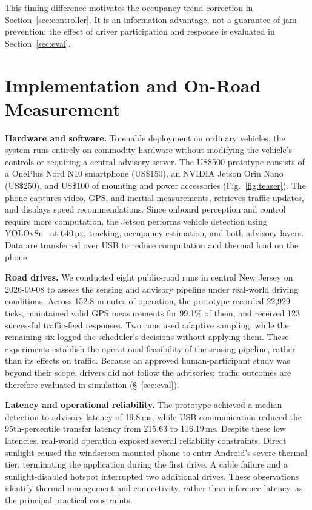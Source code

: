 \documentclass[letterpaper, 10pt, journal, twoside]{IEEEtran}
\begin{document}
This timing difference motivates the occupancy-trend correction in Section~\ref{sec:controller}. It is an information advantage, not a guarantee of jam prevention; the effect of driver participation and response is evaluated in Section~\ref{sec:eval}.

\section{Implementation and On-Road Measurement}

\label{sec:road}

\noindent\textbf{Hardware and software.} To enable deployment on ordinary vehicles, the system runs entirely on commodity hardware without modifying the vehicle's controls or requiring a central advisory server. The US\$500 prototype consists of a OnePlus Nord N10 smartphone (US\$150), an NVIDIA Jetson Orin Nano (US\$250), and US\$100 of mounting and power accessories (Fig.~\ref{fig:teaser}). The phone captures video, GPS, and inertial measurements, retrieves traffic updates, and displays speed recommendations. Since onboard perception and control require more computation, the Jetson performs vehicle detection using YOLOv8n~\cite{redmon2016yolo} at 640\,px, tracking, occupancy estimation, and both advisory layers. Data are transferred over USB to reduce computation and thermal load on the phone.

\noindent\textbf{Road drives.} We conducted eight public-road runs in central New Jersey on 2026-09-08 to assess the sensing and advisory pipeline under real-world driving conditions. Across 152.8 minutes of operation, the prototype recorded 22,929 ticks, maintained valid GPS measurements for 99.1\% of them, and received 123 successful traffic-feed responses. Two runs used adaptive sampling, while the remaining six logged the scheduler's decisions without applying them. These experiments establish the operational feasibility of the sensing pipeline, rather than its effects on traffic. Because an approved human-participant study was beyond their scope, drivers did not follow the advisories; traffic outcomes are therefore evaluated in simulation (\S~\ref{sec:eval}).

\noindent\textbf{Latency and operational reliability.} The prototype achieved a median detection-to-advisory latency of 19.8\,ms, while USB communication reduced the 95th-percentile transfer latency from 215.63 to 116.19\,ms. Despite these low latencies, real-world operation exposed several reliability constraints. Direct sunlight caused the windscreen-mounted phone to enter Android's severe thermal tier, terminating the application during the first drive. A cable failure and a sunlight-disabled hotspot interrupted two additional drives. These observations identify thermal management and connectivity, rather than inference latency, as the principal practical constraints.
\end{document}

